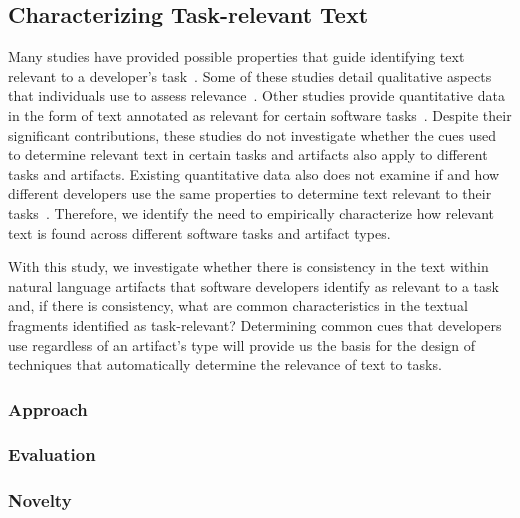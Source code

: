 

\subsection{Characterizing Task-relevant Text}




Many studies have provided possible properties that guide identifying text relevant to a developer's task~\cite{Bavota2016}.
Some of these studies 
detail qualitative aspects that individuals use to assess relevance~\cite{Barry1994, Freund2015, Forward2002}.
Other studies provide quantitative data in the form of 
text annotated as relevant for certain software tasks~\cite{Jiang2016b, Robillard2015}. 
Despite their significant contributions,
these studies do not investigate whether the cues used to determine relevant text in certain tasks and artifacts 
 also apply to different tasks and artifacts. 
Existing quantitative data also does not examine if and how different developers 
use the same properties to determine text relevant to their tasks~\cite{Freund2013, Freund2015}.
Therefore, we identify the need to empirically characterize 
how relevant text is found across different software tasks and artifact types. 



With this study, we investigate whether
there is consistency in the text within natural language artifacts
that software developers identify as relevant to a task and, if there
is consistency, what are common characteristics in the textual fragments identified as task-relevant?
Determining common cues that
developers use regardless of an artifact's type
will provide us the basis for the design of techniques that automatically determine
the relevance of text to tasks.





\subsubsection{Approach}



\subsubsection{Evaluation}



\subsubsection{Novelty}





